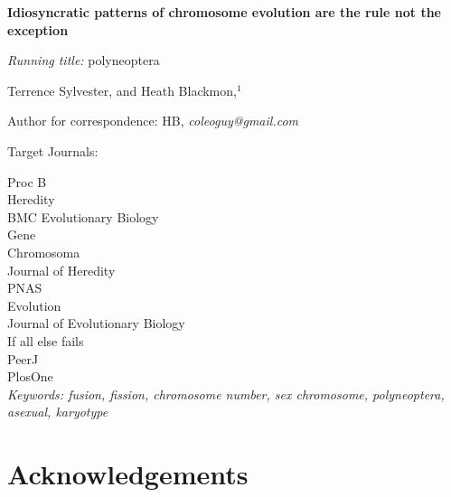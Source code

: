 \documentclass[12pt]{article}
\begin{document}
\linenumbers

\begin{center}
\textbf{Idiosyncratic patterns of chromosome evolution are the rule not the exception}
\end{center}

\vfill
\noindent
\textit{Running title:} polyneoptera

\vfill
\noindent
Terrence Sylvester,
%
\noindent
and
Heath Blackmon,$^1$
\vfill


\theendnotes
\noindent
Author for correspondence: HB, \textit{coleoguy@gmail.com}
\vfill

\clearpage

 
\bigskip
\noindent

\noindent 
Target Journals:

\noindent 
Proc B\\
Heredity\\
BMC Evolutionary Biology\\
Gene\\
Chromosoma\\
Journal of Heredity\\
PNAS\\
Evolution\\
Journal of Evolutionary Biology\\

\noindent 
If all else fails \\
PeerJ\\
PlosOne\\

\noindent
\textit{Keywords: fusion, fission, chromosome number, sex chromosome, polyneoptera, asexual, karyotype}


\clearpage





\clearpage

\section{Acknowledgements}





\clearpage




\nolinenumbers
\clearpage


\clearpage

\end{document}
